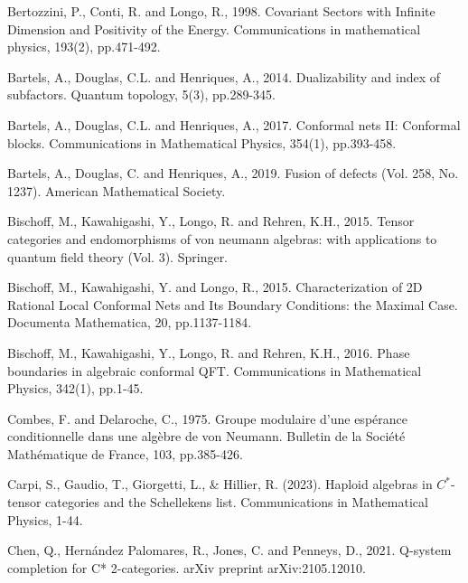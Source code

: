 \documentclass[11pt,b5paper,notitlepage]{article}
\theoremstyle{definition}
\theoremstyle{plain}
\numberwithin{equation}{section}
\begin{document}
	\begin{thebibliography}{999999}
		\footnotesize	
		
		
		
		

Bertozzini, P., Conti, R. and Longo, R., 1998. Covariant Sectors with Infinite Dimension and Positivity of the Energy. Communications in mathematical physics, 193(2), pp.471-492.

Bartels, A., Douglas, C.L. and Henriques, A., 2014. Dualizability and index of subfactors. Quantum topology, 5(3), pp.289-345.

Bartels, A., Douglas, C.L. and Henriques, A., 2017. Conformal nets II: Conformal blocks. Communications in Mathematical Physics, 354(1), pp.393-458.

Bartels, A., Douglas, C. and Henriques, A., 2019. Fusion of defects (Vol. 258, No. 1237). American Mathematical Society.

Bischoff, M., Kawahigashi, Y., Longo, R. and Rehren, K.H., 2015. Tensor categories and endomorphisms of von neumann algebras: with applications to quantum field theory (Vol. 3). Springer.

Bischoff, M., Kawahigashi, Y. and Longo, R., 2015. Characterization of 2D Rational Local Conformal Nets and Its Boundary Conditions: the Maximal Case. Documenta Mathematica, 20, pp.1137-1184.

Bischoff, M., Kawahigashi, Y., Longo, R. and Rehren, K.H., 2016. Phase boundaries in algebraic conformal QFT. Communications in Mathematical Physics, 342(1), pp.1-45.



Combes, F. and Delaroche, C., 1975. Groupe modulaire d'une espérance conditionnelle dans une algèbre de von Neumann. Bulletin de la Société Mathématique de France, 103, pp.385-426.

Carpi, S., Gaudio, T., Giorgetti, L., \& Hillier, R. (2023). Haploid algebras in $C^*$-tensor categories and the Schellekens list. Communications in Mathematical Physics, 1-44.

Chen, Q., Hernández Palomares, R., Jones, C. and Penneys, D., 2021. Q-system completion for C* 2-categories. arXiv preprint arXiv:2105.12010.


\end{thebibliography}
\end{document}
